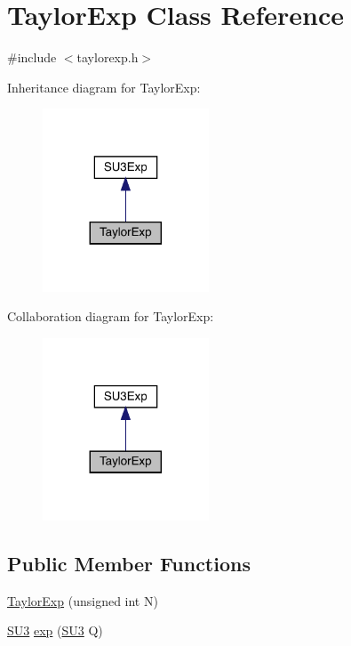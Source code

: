 \hypertarget{class_taylor_exp}{}\section{Taylor\+Exp Class Reference}
\label{class_taylor_exp}


{\ttfamily \#include $<$taylorexp.\+h$>$}



Inheritance diagram for Taylor\+Exp\+:\nopagebreak
\begin{figure}[H]
\begin{center}
\leavevmode
\includegraphics[width=140pt]{class_taylor_exp__inherit__graph}
\end{center}
\end{figure}


Collaboration diagram for Taylor\+Exp\+:\nopagebreak
\begin{figure}[H]
\begin{center}
\leavevmode
\includegraphics[width=140pt]{class_taylor_exp__coll__graph}
\end{center}
\end{figure}
\subsection*{Public Member Functions}
\begin{DoxyCompactItemize}
\item 
\mbox{\hyperlink{class_taylor_exp_ac8929cf53cb6b8d109220c8284169a82}{Taylor\+Exp}} (unsigned int N)
\item 
\mbox{\hyperlink{class_s_u3}{S\+U3}} \mbox{\hyperlink{class_taylor_exp_a622c4af7d88a43a7bcda97722b62fc82}{exp}} (\mbox{\hyperlink{class_s_u3}{S\+U3}} Q)
\end{DoxyCompactItemize}


